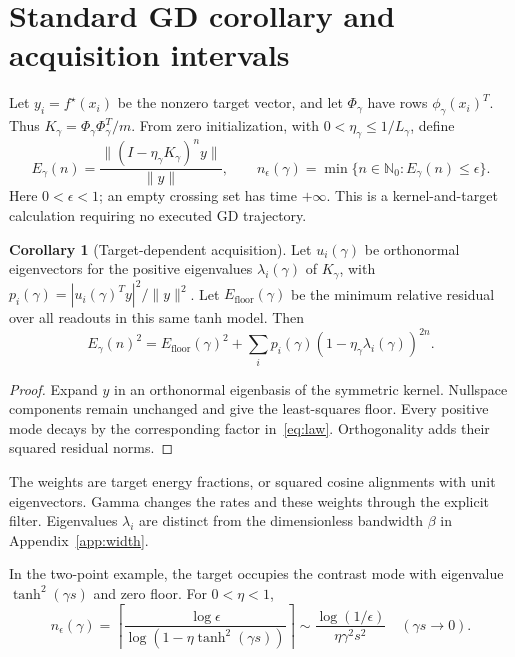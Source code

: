 \documentclass[11pt]{article}
\theoremstyle{definition}
\newtheorem{corollary}{Corollary}
\begin{document}
\clearpage
\section{Standard GD corollary and acquisition intervals}\label{app:time}
Let $y_i=f^\star(x_i)$ be the nonzero target vector, and let $\Phi_\gamma$
have rows $\phi_\gamma(x_i)^T$. Thus $K_\gamma=\Phi_\gamma\Phi_\gamma^T/m$.
From zero initialization, with $0<\eta_\gamma\le1/L_\gamma$, define
\begin{equation}
 E_\gamma(n)=\frac{\|(I-\eta_\gamma K_\gamma)^ny\|}{\|y\|},\qquad
 n_\epsilon(\gamma)=\min\{n\in\mathbb N_0:E_\gamma(n)\le\epsilon\}.
\end{equation}
Here $0<\epsilon<1$; an empty crossing set has time $+\infty$. This is
a kernel-and-target calculation requiring no executed GD trajectory.

\begin{corollary}[Target-dependent acquisition]
Let $u_i(\gamma)$ be orthonormal eigenvectors for the positive eigenvalues
$\lambda_i(\gamma)$ of $K_\gamma$, with
$p_i(\gamma)=|u_i(\gamma)^Ty|^2/\|y\|^2$. Let
$E_{\mathrm{floor}}(\gamma)$ be the minimum relative residual over all
readouts in this same tanh model. Then
\begin{equation}\label{eq:law}
 E_\gamma(n)^2=E_{\mathrm{floor}}(\gamma)^2+
 \sum_i p_i(\gamma)(1-\eta_\gamma\lambda_i(\gamma))^{2n}.
\end{equation}
\end{corollary}
\begin{proof}
Expand $y$ in an orthonormal eigenbasis of the symmetric kernel. Nullspace
components remain unchanged and give the least-squares floor. Every positive
mode decays by the corresponding factor in~\eqref{eq:law}. Orthogonality
adds their squared residual norms.
\end{proof}
The weights are target energy fractions, or squared cosine alignments with
unit eigenvectors. Gamma changes the rates and these weights through the
explicit filter. Eigenvalues $\lambda_i$ are distinct from the dimensionless
bandwidth $\beta$ in Appendix~\ref{app:width}.

In the two-point example, the target occupies the contrast mode with
eigenvalue $\tanh^2(\gamma s)$ and zero floor. For $0<\eta<1$,
\begin{equation}
 n_\epsilon(\gamma)=\left\lceil\frac{\log\epsilon}
 {\log(1-\eta\tanh^2(\gamma s))}\right\rceil
 \sim\frac{\log(1/\epsilon)}{\eta\gamma^2s^2}\quad(\gamma s\to0).
\end{equation}
\end{document}
